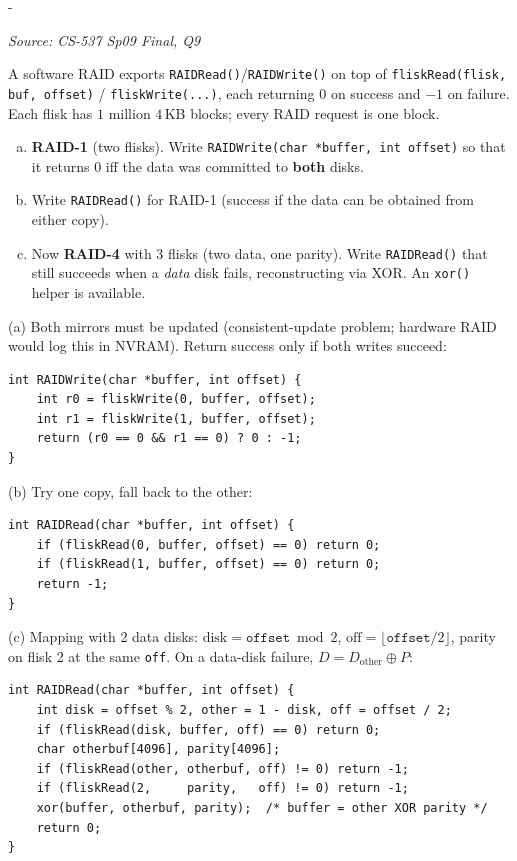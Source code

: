 \documentclass[11pt,a4paper]{article}
\makeatletter
\newcommand{\keepspace}[1]{\par\penalty-100\begingroup
  \setlength{\dimen@}{#1}\dimen@ii\pagegoal\advance\dimen@ii-\pagetotal
  \ifdim\dimen@>\dimen@ii\ifdim\dimen@ii>\z@\vfil\fi\break\fi\endgroup}
\newcounter{qn}[section]
\newenvironment{Qn}[4]{%
  \refstepcounter{qn}\keepspace{7\baselineskip}%
  \begin{tcolorbox}[qboxstyle, title={Q\thesection.\theqn\ \ [#1 \textbar\ #2]\ \ #4}]%
  {\footnotesize\color{g3}\textit{Source: #3}}\par\smallskip%
}{%
  \end{tcolorbox}%
}
\newenvironment{Sol}{%
  \begin{tcolorbox}[sboxstyle, title={Solution}]%
}{%
  \end{tcolorbox}\vspace{0.35em}%
}
\makeatother
\begin{document}
\begin{Qn}{Hard}{Lect 22A}{CS-537 Sp09 Final, Q9}{Software RAID-1 read/write and RAID-4 reconstruct-read}
A software RAID exports \texttt{RAIDRead()}/\texttt{RAIDWrite()} on top
of \texttt{fliskRead(flisk, buf, offset)} / \texttt{fliskWrite(...)},
each returning $0$ on success and $-1$ on failure. Each flisk has
$1$ million $4$\,KB blocks; every RAID request is one block.
\begin{enumerate}[(a)]
\item \textbf{RAID-1} (two flisks). Write
      \texttt{RAIDWrite(char *buffer, int offset)} so that it returns
      $0$ iff the data was committed to \textbf{both} disks.
\item Write \texttt{RAIDRead()} for RAID-1 (success if the data can be
      obtained from either copy).
\item Now \textbf{RAID-4} with 3 flisks (two data, one parity). Write
      \texttt{RAIDRead()} that still succeeds when a \emph{data} disk
      fails, reconstructing via XOR. An \texttt{xor()} helper is
      available.
\end{enumerate}
\end{Qn}
\begin{Sol}
(a) Both mirrors must be updated (consistent-update problem; hardware
RAID would log this in NVRAM). Return success only if both writes
succeed:
\begin{lstlisting}[numbers=none]
int RAIDWrite(char *buffer, int offset) {
    int r0 = fliskWrite(0, buffer, offset);
    int r1 = fliskWrite(1, buffer, offset);
    return (r0 == 0 && r1 == 0) ? 0 : -1;
}
\end{lstlisting}

(b) Try one copy, fall back to the other:
\begin{lstlisting}[numbers=none]
int RAIDRead(char *buffer, int offset) {
    if (fliskRead(0, buffer, offset) == 0) return 0;
    if (fliskRead(1, buffer, offset) == 0) return 0;
    return -1;
}
\end{lstlisting}

(c) Mapping with 2 data disks: $\mathrm{disk}=\texttt{offset}\bmod 2$,
$\mathrm{off}=\lfloor\texttt{offset}/2\rfloor$, parity on flisk 2 at
the same \texttt{off}. On a data-disk failure, $D = D_{\mathrm{other}}
\oplus P$:
\begin{lstlisting}[numbers=none]
int RAIDRead(char *buffer, int offset) {
    int disk = offset % 2, other = 1 - disk, off = offset / 2;
    if (fliskRead(disk, buffer, off) == 0) return 0;
    char otherbuf[4096], parity[4096];
    if (fliskRead(other, otherbuf, off) != 0) return -1;
    if (fliskRead(2,     parity,   off) != 0) return -1;
    xor(buffer, otherbuf, parity);  /* buffer = other XOR parity */
    return 0;
}
\end{lstlisting}
\end{Sol}
\end{document}

